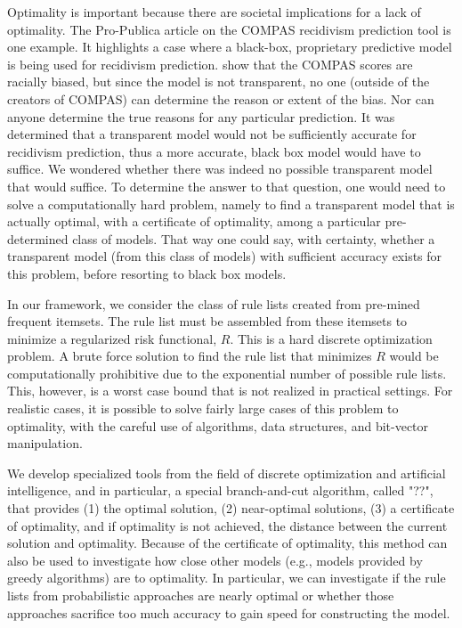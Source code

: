 Optimality is important because there are societal implications for a lack of optimality. The Pro-Publica article on the COMPAS recidivism prediction tool \citep{LarsonMaKiAn16} is one example. It highlights a case where a black-box, proprietary predictive model is being used for recidivism prediction. \citep{LarsonMaKiAn16}  show that the COMPAS scores are racially biased, but since the model is not transparent, no one (outside of the creators of COMPAS) can determine the reason or extent of the bias. Nor can anyone determine the true reasons for any particular prediction. It was determined that a transparent model would not be sufficiently accurate for recidivism prediction, thus a more accurate, black box model would have to suffice. We wondered whether there was indeed no possible transparent model that would suffice. To determine the answer to that question, one would need to solve a computationally hard problem, namely to find a transparent model that is actually optimal, with a certificate of optimality, among a particular pre-determined class of models. That way one could say, with certainty, whether a transparent model (from this class of models) with sufficient accuracy exists for this problem, before resorting to black box models.

In our framework, we consider the class of rule lists created from pre-mined frequent itemsets. The rule list must be assembled from these itemsets to minimize a regularized risk functional, $R$. This is a hard discrete optimization problem. A brute force solution to find the rule list that minimizes $R$ would be computationally prohibitive due to the exponential number of possible rule lists. This, however, is a worst case bound that is not realized in practical settings. For realistic cases, it is possible to solve fairly large cases of this problem to optimality, with the careful use of algorithms, data structures, and bit-vector manipulation.

We develop specialized tools from the field of discrete optimization and artificial intelligence, and in particular, a special branch-and-cut algorithm, called "??", that provides (1) the optimal solution, (2) near-optimal solutions, (3) a certificate of optimality, and if optimality is not achieved, the distance between the current solution and optimality. Because of the certificate of optimality, this method can also be used to investigate how close other models (e.g., models provided by greedy algorithms) are to optimality. In particular, we can investigate if the rule lists from probabilistic approaches are nearly optimal or whether those approaches sacrifice too much accuracy to gain speed for constructing the model.

